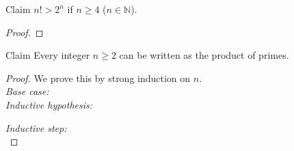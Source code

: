 \documentclass [aspectratio=169]{beamer}
\newcommand{\N}{{\mathbb{N}}}
\begin{document}
\begin{frame}
\begin{exampleblock}{Claim}
$n! > 2^n$ if $n \geq 4$ ($n \in \N$).
\end{exampleblock}


\begin{proof}
\vspace{7em}
\end{proof}
\end{frame}



\begin{frame}
\begin{exampleblock}{Claim}
Every integer $n \geq 2$ can be written as the product of primes.
\end{exampleblock}

\begin{proof}
We prove this by strong induction on $n$. \\
{\it Base case:} \\ %

{\it Inductive hypothesis:} \\  %
\vspace{1em}

{\it Inductive step:} \\
\vspace{4em}
%

\end{proof}

\end{frame}
\end{document}
